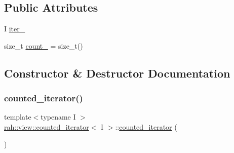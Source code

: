 \subsection*{Public Attributes}
\begin{DoxyCompactItemize}
\item 
I \mbox{\hyperlink{structrah_1_1view_1_1counted__iterator_a907dba6ac64293e4c5718e522da4972e}{iter\+\_\+}}
\item 
size\+\_\+t \mbox{\hyperlink{structrah_1_1view_1_1counted__iterator_a235949f8f72f083b6a65e6f385327d42}{count\+\_\+}} = size\+\_\+t()
\end{DoxyCompactItemize}


\subsection{Constructor \& Destructor Documentation}
\mbox{\label{structrah_1_1view_1_1counted__iterator_a73f275166ac5f41bd93d96ccab15eab0}} 
\subsubsection{\texorpdfstring{counted\_iterator()}{counted\_iterator()}\hspace{0.1cm}{\footnotesize\ttfamily [1/2]}}
{\footnotesize\ttfamily template$<$typename I $>$ \\
\mbox{\hyperlink{structrah_1_1view_1_1counted__iterator}{rah\+::view\+::counted\+\_\+iterator}}$<$ I $>$\+::\mbox{\hyperlink{structrah_1_1view_1_1counted__iterator}{counted\+\_\+iterator}} (\begin{DoxyParamCaption}{ }\end{DoxyParamCaption})\hspace{0.3cm}{\ttfamily [default]}}

\mbox{\label{structrah_1_1view_1_1counted__iterator_aa26e9c047e175303c296758316634890}} 
